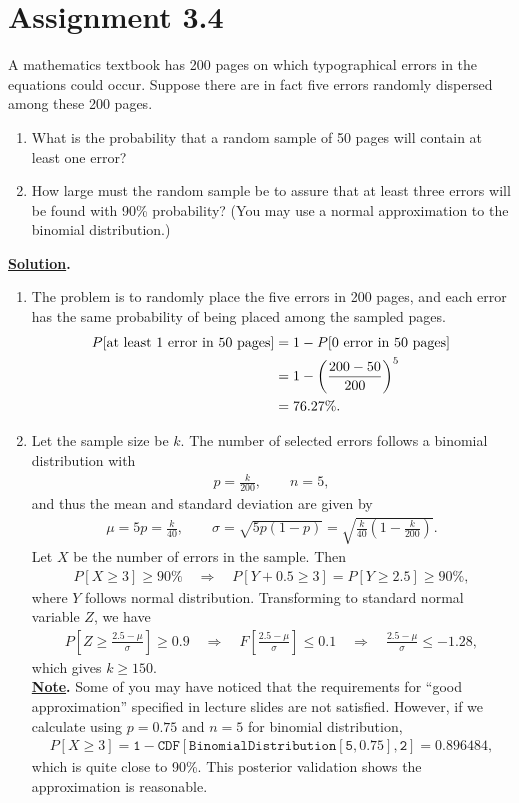 \section*{Assignment 3.4}

A mathematics textbook has 200 pages on which typographical errors in the equations could occur. Suppose there are in fact five errors randomly dispersed among these 200 pages.
\begin{enumerate}
	\item What is the probability that a random sample of 50 pages will contain at least one error?
	\item How large must the random sample be to assure that at least three errors will be found with 90\% probability? (You may use a normal approximation to the binomial distribution.)
\end{enumerate}
\textbf{\underline{Solution}.}
\begin{enumerate}
	\item The problem is to randomly place the five errors in 200 pages, and each error has the same probability of being placed among the sampled pages.
	\begin{align*}
	P[\mathrm{at\ least\ 1\ error\ in\ 50\ pages}] & = 1 - P[\mathrm{0\ error\ in\ 50\ pages}] \\
	& = 1 - \left(\frac{200-50}{200} \right)^5 \\
	& = 76.27\%.
	\end{align*}
	\item Let the sample size be $k$. The number of selected errors follows a binomial distribution with
	\begin{align*}
	p = \frac{k}{200}, \qquad n = 5,
	\end{align*}
	and thus the mean and standard deviation are given by
	\begin{align*}
	\mu = 5p = \frac{k}{40}, \qquad \sigma = \sqrt{5p(1-p)} = \sqrt{\frac{k}{40}\left(1 - \frac{k}{200} \right)}.
	\end{align*}
	Let $X$ be the number of errors in the sample. Then
	\begin{align*}
	P[X\geq 3] \geq 90\% \quad\Rightarrow\quad P[Y + 0.5 \geq 3] = P[Y\geq 2.5] \geq 90\%,
	\end{align*}
	where $Y$ follows normal distribution. Transforming to standard normal variable $Z$, we have
	\begin{align*}
	P\left[Z\geq \frac{2.5-\mu}{\sigma} \right]\geq 0.9 \quad\Rightarrow\quad F\left[\frac{2.5-\mu}{\sigma} \right] \leq 0.1 \quad\Rightarrow \quad \frac{2.5-\mu}{\sigma} \leq -1.28,
	\end{align*}
	which gives $k\geq 150$.\\
	\textbf{\underline{Note}.} Some of you may have noticed that the requirements for ``good approximation'' specified in lecture slides are not satisfied. However, if we calculate using $p = 0.75$ and $n = 5$ for binomial distribution,
	\begin{align*}
	P[X\geq 3] = \mathtt{1 - CDF[BinomialDistribution[5, 0.75], 2]} = 0.896484,
	\end{align*}
	which is quite close to 90\%. This posterior validation shows the approximation is reasonable.
\end{enumerate}



